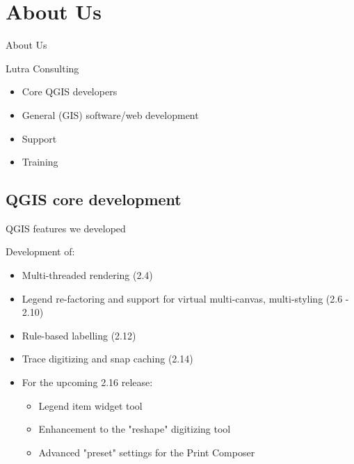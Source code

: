 \section{About Us}

\begin{frame}{About Us}
	\begin{block}{Lutra Consulting}
		\begin{itemize}
			\item Core QGIS developers
			\item General (GIS) software/web development
			\item Support
			\item Training
		\end{itemize}
	\end{block}
\end{frame}

\subsection{QGIS core development}
\begin{frame}{QGIS features we developed}
\begin{block}{Development of:}
	\begin{itemize}
		\item Multi-threaded rendering (2.4)
		\item Legend re-factoring and support for virtual multi-canvas, multi-styling (2.6 - 2.10)
		\item Rule-based labelling (2.12)
		\item Trace digitizing and snap caching (2.14)
		\item For the upcoming 2.16 release:
		\begin{itemize}
			\item Legend item widget tool
			\item Enhancement to the "reshape" digitizing tool
			\item Advanced "preset" settings for the Print Composer
		\end{itemize}		
	\end{itemize}
\end{block}
\end{frame}


